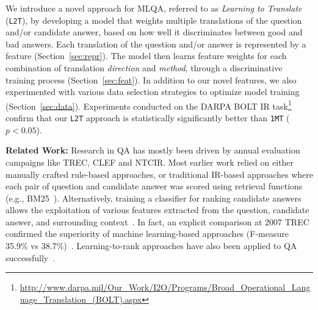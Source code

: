 \documentclass{sig-alternate-05-2015}
\begin{document}

We introduce a novel approach for MLQA, referred to as \emph{Learning to Translate} ({\tt L2T}), by developing a model that 
weights multiple translations of the question and/or candidate answer, based on how well it discriminates between good and bad answers.
Each translation of the question and/or answer is represented by a feature (Section~\ref{sec:repr}). The model then learns feature weights for 
each combination of translation \emph{direction} and \emph{method}, through a discriminative training process (Section~\ref{sec:feat}). 
In addition to our novel features, we also experimented with various data selection strategies to optimize model training (Section~\ref{sec:data}). 
Experiments conducted on the DARPA BOLT IR task\footnote{{\scriptsize \url{
http://www.darpa.mil/Our_Work/I2O/Programs/Broad_Operational_Language_Translation_(BOLT).aspx}}} 
confirm that our {\tt L2T} approach is statistically significantly better than {\tt 1MT} ($p<0.05$).


\textbf{Related Work:}
Research in QA has mostly been driven by annual evaluation campaigns like TREC,%
CLEF
and NTCIR.
Most earlier work relied on either manually crafted rule-based approaches, or 
traditional IR-based approaches where each pair of question and candidate answer was scored using retrieval functions (e.g., 
BM25~\cite{Robertson:2004}). Alternatively, training a classifier for ranking candidate answers allows the exploitation of 
various features extracted from the question, candidate answer, and surrounding context~\cite{Madnani:2007aa,Zhang:2007aa}. 
In fact, an explicit comparison at 2007 TREC confirmed the superiority of machine learning-based approaches (F-measure 35.9\%
vs 38.7\%)~\cite{Zhang:2007aa}. Learning-to-rank approaches have also been applied to QA successfully~\cite{Agarwal:2012aa}.
\end{document}
